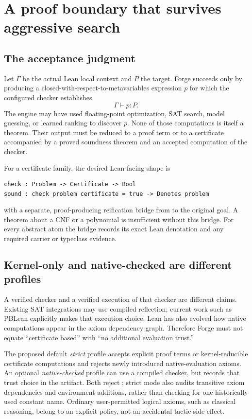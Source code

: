 \documentclass[11pt,letterpaper]{article}
\newcommand{\code}[1]{\texttt{\detokenize{#1}}}
\theoremstyle{definition}\newtheorem{definition}[proposition]{Definition}
\begin{document}
\section{A proof boundary that survives aggressive search}
\label{sec:trust}
\subsection{The acceptance judgment}
Let $\Gamma$ be the actual Lean local context and $P$ the target. Forge succeeds only by producing a closed-with-respect-to-metavariables expression $p$ for which the configured checker establishes
\[
\Gamma\vdash p:P.
\]
The engine may have used floating-point optimization, SAT search, model guessing, or learned ranking to discover $p$. None of those computations is itself a theorem. Their output must be reduced to a proof term or to a certificate accompanied by a proved soundness theorem and an accepted computation of the checker.

For a certificate family, the desired Lean-facing shape is
\begin{lstlisting}
check : Problem -> Certificate -> Bool
sound : check problem certificate = true -> Denotes problem
\end{lstlisting}
with a separate, proof-producing reification bridge from \code{Denotes problem} to the original goal. A theorem about a CNF or a polynomial is insufficient without this bridge. For every abstract atom the bridge records its exact Lean denotation and any required carrier or typeclass evidence.

\subsection{Kernel-only and native-checked are different profiles}
A verified checker and a verified execution of that checker are different claims. Existing SAT integrations may use compiled reflection; current work such as PBLean explicitly makes that execution choice. Lean has also evolved how native computations appear in the axiom dependency graph. Therefore Forge must not equate ``certificate based'' with ``no additional evaluation trust.''~\cite{pblean,nativerfc}

The proposed default \emph{strict} profile accepts explicit proof terms or kernel-reducible certificate computations and rejects newly introduced native-evaluation axioms. An optional \emph{native-checked} profile can use a compiled checker, but records that trust choice in the artifact. Both reject \code{sorryAx}; strict mode also audits transitive axiom dependencies and environment additions, rather than checking for one historically used constant name. Ordinary user-permitted logical axioms, such as classical reasoning, belong to an explicit policy, not an accidental tactic side effect.
\end{document}

